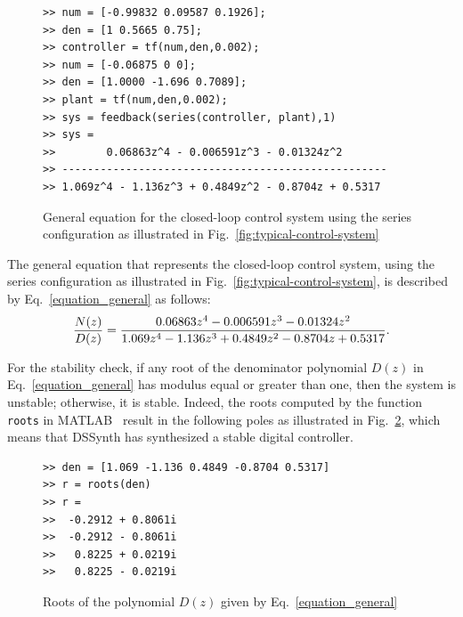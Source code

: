 \documentclass[conference]{IEEEtran}
\begin{document}
\begin{figure}[ht]
\scriptsize
\begin{lstlisting}[xleftmargin=.025\textwidth,xrightmargin=.025\textwidth, frame=single,basicstyle=\tt]
>> num = [-0.99832 0.09587 0.1926];
>> den = [1 0.5665 0.75];
>> controller = tf(num,den,0.002);
>> num = [-0.06875 0 0];
>> den = [1.0000 -1.696 0.7089];
>> plant = tf(num,den,0.002);
>> sys = feedback(series(controller, plant),1)
>> sys =
>>        0.06863z^4 - 0.006591z^3 - 0.01324z^2
>> ---------------------------------------------------
>> 1.069z^4 - 1.136z^3 + 0.4849z^2 - 0.8704z + 0.5317
\end{lstlisting}
\vspace{-0.2cm}
\caption{General equation for the closed-loop control system using the series configuration as
illustrated in Fig.~\ref{fig:typical-control-system}}
\label{combine-controller-plant}
\end{figure}

The general equation that represents the closed-loop control system, using
the series configuration as illustrated in
Fig.~\ref{fig:typical-control-system}, is described by
Eq.~\ref{equation_general} as follows:
%
\begin{equation}
\small
\label{equation_general}
\frac{N(z)}{D(z)}=\frac{0.06863z^{4} - 0.006591z^{3} - 0.01324z^{2}}{1.069z^{4} - 1.136z^{3} + 0.4849z^{2} -0.8704z + 0.5317}.
\end{equation}
 
For the stability check, if any root of the denominator polynomial $D(z)$ in
Eq.~\ref{equation_general} has modulus equal or greater than one, then the
system is unstable; otherwise, it is stable.  Indeed, the roots computed by
the function \texttt{roots} in MATLAB~\cite{matlab-toolbox} result in the
following poles as illustrated in Fig.~\ref{roots-of-dz}, which means that
DSSynth has synthesized a stable digital controller.

\begin{figure}[ht]
\scriptsize
\begin{lstlisting}[xleftmargin=.025\textwidth,xrightmargin=.025\textwidth, frame=single, basicstyle=\tt]
>> den = [1.069 -1.136 0.4849 -0.8704 0.5317]
>> r = roots(den)
>> r =
>>  -0.2912 + 0.8061i
>>  -0.2912 - 0.8061i
>>   0.8225 + 0.0219i
>>   0.8225 - 0.0219i
\end{lstlisting}
\vspace{-0.2cm}
\caption{Roots of the polynomial $D(z)$ given by Eq.~\ref{equation_general}}
\label{roots-of-dz}
\end{figure}
\end{document}
